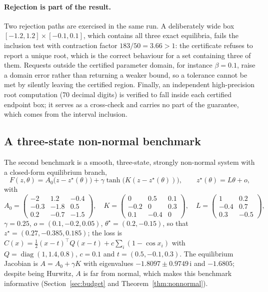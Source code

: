 \documentclass[11pt]{article}
\theoremstyle{definition}
\theoremstyle{remark}
\newcommand{\diag}{\operatorname{diag}}
\begin{document}
\paragraph{Rejection is part of the result.}
Two rejection paths are exercised in the same run. A deliberately wide box
$[-1.2,1.2]\times[-0.1,0.1]$, which contains all three exact equilibria, fails the inclusion test
with contraction factor $183/50 = 3.66 > 1$: the certificate refuses to report a unique root,
which is the correct behaviour for a set containing three of them. Requests outside the certified
parameter domain, for instance $\beta = 0.1$, raise a domain error rather than returning a weaker
bound, so a tolerance cannot be met by silently leaving the certified region. Finally, an
independent high-precision root computation (70 decimal digits) is verified to fall inside each
certified endpoint box; it serves as a cross-check and carries no part of the guarantee, which
comes from the interval inclusion.

\subsection{A three-state non-normal benchmark}\label{sec:nonnormal}

The second benchmark is a smooth, three-state, strongly non-normal system with a closed-form
equilibrium branch,
\begin{equation}
F(z,\theta) = A_0\bigl(z - z^\star(\theta)\bigr) + \gamma \tanh\bigl(K(z - z^\star(\theta))\bigr),
\qquad z^\star(\theta) = L\theta + o,
\label{eq:three-state}
\end{equation}
with
\begin{equation}
A_0 = \begin{pmatrix} -2 & 1.2 & -0.4 \\ -0.3 & -1.8 & 0.5 \\ 0.2 & -0.7 & -1.5 \end{pmatrix},
\quad
K = \begin{pmatrix} 0 & 0.5 & 0.1 \\ -0.2 & 0 & 0.3 \\ 0.1 & -0.4 & 0 \end{pmatrix},
\quad
L = \begin{pmatrix} 1 & 0.2 \\ -0.4 & 0.7 \\ 0.3 & -0.5 \end{pmatrix},
\end{equation}
$\gamma = 0.25$, $o = (0.1,-0.2,0.05)$, $\theta^\star = (0.2,-0.15)$, so that
$z^\star = (0.27,-0.385,0.185)$; the loss is
$C(x) = \tfrac12 (x-t)^{\top}Q(x-t) + c\sum_i(1-\cos x_i)$ with
$Q = \diag(1,1.4,0.8)$, $c = 0.1$ and $t = (0.5,-0.1,0.3)$. The equilibrium Jacobian is
$A = A_0 + \gamma K$ with eigenvalues $-1.8097 \pm 0.9749\,\mathrm i$ and $-1.6805$; despite being
Hurwitz, $A$ is far from normal, which makes this benchmark informative (Section~\ref{sec:budget}
and Theorem~\ref{thm:nonnormal}).
\end{document}
